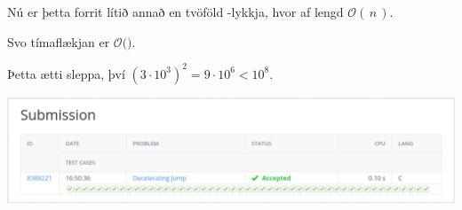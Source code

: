 {
}

{
    {
        \item<1-> Nú er þetta forrit lítið annað en tvöföld -lykkja, hvor af lengd $\mathcal{O}(\,n\,)$.
            \item<2-> Svo tímaflækjan er $\mathcal{O}($$)$.
            \item<4-> Þetta ætti sleppa, því $(3 \cdot 10^3)^2 = 9 \cdot 10^6 < 10^8$.
            \item<5->[] \includegraphics[scale = 0.25]{fig/ac.png}
    }
}

{
}


